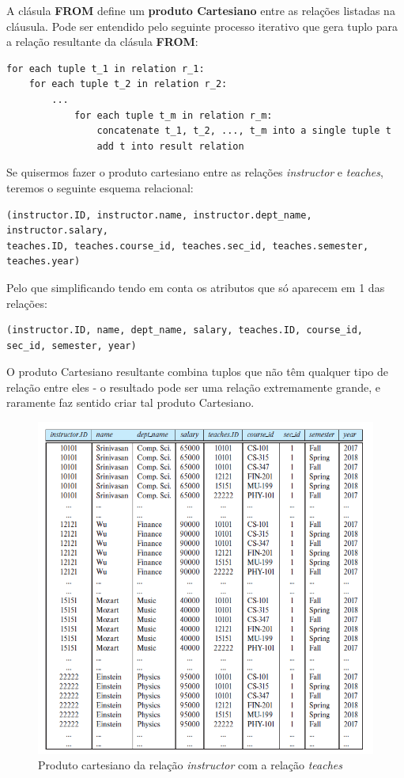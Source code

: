 \documentclass[oneside]{book}
\theoremstyle{definition}
\begin{document}
A clásula \textbf{FROM} define um \textbf{produto Cartesiano} entre as relações listadas na cláusula. Pode ser entendido pelo seguinte processo iterativo que gera tuplo para a relação resultante da clásula \textbf{FROM}:
\begin{verbatim}
for each tuple t_1 in relation r_1:
    for each tuple t_2 in relation r_2:
        ...
            for each tuple t_m in relation r_m:
                concatenate t_1, t_2, ..., t_m into a single tuple t
                add t into result relation   
\end{verbatim}

Se quisermos fazer o produto cartesiano entre as relações \textit{instructor} e \textit{teaches}, teremos o seguinte esquema relacional:
\begin{verbatim}
(instructor.ID, instructor.name, instructor.dept_name, instructor.salary,
teaches.ID, teaches.course_id, teaches.sec_id, teaches.semester, teaches.year)
\end{verbatim}
Pelo que simplificando tendo em conta os atributos que só aparecem em 1 das relações:
\begin{verbatim}
(instructor.ID, name, dept_name, salary, teaches.ID, course_id, sec_id, semester, year)
\end{verbatim}
O produto Cartesiano resultante combina tuplos que não têm qualquer tipo de relação entre eles - o resultado pode ser uma relação extremamente grande, e raramente faz sentido criar tal produto Cartesiano.

\begin{figure}[H]
    \centering
    \includegraphics[scale = 0.4]{cap_sql/prod_cartesiano.png}
    \caption{Produto cartesiano da relação \textit{instructor} com a relação \textit{teaches}}
\end{figure}
\end{document}
